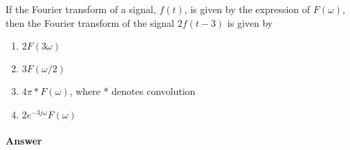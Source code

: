 \documentclass[12pt,a4paper]{article}
\begin{document}
\begin{q}{}
If the Fourier transform of a signal, $f(t)$, is given by the expression of $F(\omega)$, then the Fourier transform of the signal $2f(t-3)$ is given by

\begin{enumerate}[label=(\alph*)]
    \item $2F(3\omega)$
    \item $3F(\omega/2)$
    \item $4\pi * F(\omega)$, where * denotes convolution
    \item $2e^{-3j\omega}F(\omega)$
\end{enumerate} 


\paragraph{Answer}

\end{q}
\end{document}
